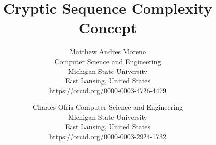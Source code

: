 \title{ Cryptic Sequence Complexity Concept }

\author{
Matthew Andres Moreno\\
Computer Science and Engineering \\
Michigan State University\\
East Lansing, United States \\
\url{https://orcid.org/0000-0003-4726-4479} \\
\and
Charles Ofria
Computer Science and Engineering \\
Michigan State University\\
East Lansing, United States \\
\url{https://orcid.org/0000-0003-2924-1732}
}

\maketitle
